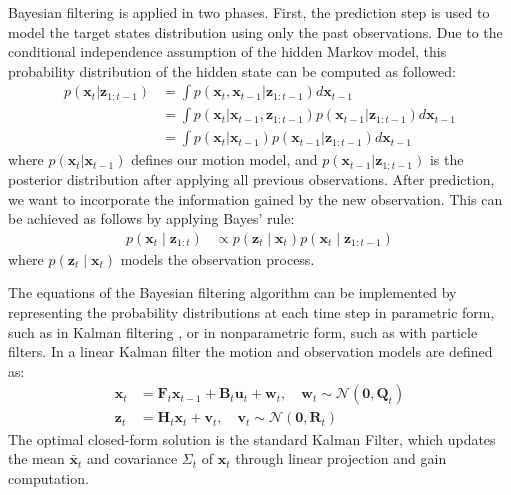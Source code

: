 Bayesian filtering is applied in two phases. First, the prediction step is used to model the target states distribution using only the past observations. Due to the conditional independence assumption of the hidden Markov model, this probability distribution of the hidden state can be computed as followed:
\begin{align*}
  p(\mathbf{x}_t|\mathbf{z}_{1:t-1}) &= \int p(\mathbf{x}_t, \mathbf{x}_{t-1} | \mathbf{z}_{1:t-1}) d\mathbf{x}_{t-1} \\
  &= \int p(\mathbf{x}_t | \mathbf{x}_{t-1}, \mathbf{z}_{1:t-1}) p(\mathbf{x}_{t-1} | \mathbf{z}_{1:t-1}) d\mathbf{x}_{t-1} \\
  &= \int p(\mathbf{x}_t | \mathbf{x}_{t-1}) p(\mathbf{x}_{t-1} | \mathbf{z}_{1:t-1}) d\mathbf{x}_{t-1}
\end{align*}
where $p(\mathbf{x}_t | \mathbf{x}_{t-1})$ defines our motion model, and $p(\mathbf{x}_{t-1} | \mathbf{z}_{1:t-1})$ is the posterior distribution after applying all previous observations. After prediction, we want to incorporate the information gained by the new observation. This can be achieved as follows by applying Bayes' rule:
\begin{align*}
  p(\mathbf{x}_t \mid \mathbf{z}_{1:t}) &\propto p(\mathbf{z}_t \mid \mathbf{x}_t) p(\mathbf{x}_t \mid \mathbf{z}_{1:t-1})
\end{align*}
where $p(\mathbf{z}_t \mid \mathbf{x}_t)$ models the observation process.

The equations of the Bayesian filtering algorithm can be implemented by representing the probability distributions at each time step in parametric form, such as in Kalman filtering \parencite{Lanz2026Notes,bar2001estimation}, or in nonparametric form, such as with particle filters. In a linear Kalman filter the motion and observation models are defined as:
\begin{align*}
  \mathbf{x}_t &= \mathbf{F}_t \mathbf{x}_{t-1} + \mathbf{B}_t \mathbf{u}_t + \mathbf{w}_t, \quad \mathbf{w}_t \sim \mathcal{N}(\mathbf{0}, \mathbf{Q}_t) \\
  \mathbf{z}_t &= \mathbf{H}_t\mathbf{x}_t + \mathbf{v}_t, \quad \mathbf{v}_t \sim \mathcal{N}(\mathbf{0}, \mathbf{R}_t)
\end{align*}
The optimal closed-form solution is the standard Kalman Filter, which updates the mean $\mathbf{\bar{x}}_t$ and covariance $\Sigma_t$ of $\mathbf{x}_t$ through linear projection and gain computation.

